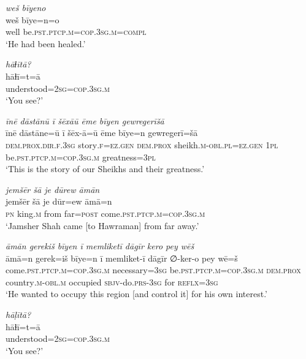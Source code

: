 \ea \label{DG.71}
\textit{weš bīyeno} \\ 
\gll weš bīye=n=o \\ 
 well be\textsc{.pst}\textsc{.ptcp}\textsc{.m}\textsc{=cop}\textsc{.3sg}\textsc{.m}\textsc{=compl} \\ 
\glt `He had been healed.'
\z 
 
\ea \label{DG.72}
\textit{hāɫītā?} \\ 
\gll hāɫī=t=ā \\ 
 understood\textsc{=\textsc{2sg}}\textsc{=cop}\textsc{.3sg}\textsc{.m} \\ 
\glt `You see?'
\z 
 
\ea \label{DG.73}
\textit{īnē dāstānū ī šēxāū ēme bīyen gewregerīšā} \\ 
\gll īnē dāstāne=ū ī šēx-ā=ū ēme bīye=n gewregerī=šā \\ 
 \textsc{dem.prox}\textsc{.dir}\textsc{\textsc{.f}}\textsc{.3sg} story\textsc{\textsc{.f}}\textsc{=ez}\textsc{.gen} \textsc{dem.prox} sheikh\textsc{.m}\textsc{-obl}\textsc{.pl}=\textsc{ez.gen} \textsc{1pl} be\textsc{.pst}\textsc{.ptcp}\textsc{.m}\textsc{=cop}\textsc{.3sg}\textsc{.m} greatness\textsc{=3pl} \\ 
\glt `This is the story of our Sheikhs and their greatness.'
\z 
 

\ea \label{DP.4}
\textit{jemšēr šā je dūrew āmān} \\ 
\gll jemšēr šā je dūr=ew āmā=n \\ 
 \textsc{pn} king\textsc{.m} from far\textsc{=\textsc{post}} come\textsc{.pst}\textsc{.ptcp}\textsc{.m}\textsc{=cop}\textsc{.3sg}\textsc{.m} \\ 
\glt `Jamsher Shah came [to Hawraman] from far away.'
\z 
 
\ea \label{DP.5}
\textit{āmān gerekiš bīyen ī memliketī dāgīr kero pey wēš} \\ 
\gll āmā=n gerek=iš bīye=n ī memliket-ī dāgīr ∅-ker-o pey wē=š \\ 
 come\textsc{.pst}\textsc{.ptcp}\textsc{.m}\textsc{=cop}\textsc{.3sg}\textsc{.m} necessary\textsc{=3sg} be\textsc{.pst}\textsc{.ptcp}\textsc{.m}\textsc{=cop}\textsc{.3sg}\textsc{.m} \textsc{dem.prox} country\textsc{.m}\textsc{-obl}\textsc{.m} occupied \textsc{sbjv-}do\textsc{.prs}\textsc{-3sg} for \textsc{reflx}\textsc{=3sg} \\ 
\glt `He wanted to occupy this region [and control it] for his own interest.'
\z 
 
\ea \label{DP.6}
\textit{hāḷītā?} \\ 
\gll hāɫī=t=ā \\ 
 understood\textsc{=\textsc{2sg}}\textsc{=cop}\textsc{.3sg}\textsc{.m} \\ 
\glt `You see?'
\z 
 

